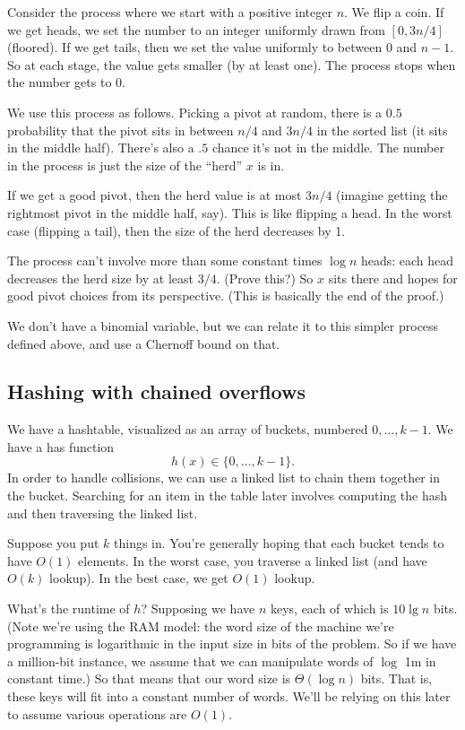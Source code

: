 \documentclass{article}
\begin{document}
Consider the process where we start with a positive integer $n$.
We flip a coin. 
If we get heads, we set the number to an integer uniformly drawn from
$[0, 3n/4]$ (floored).
If we get tails, then we set the value uniformly to between $0$ and $n - 1$.
So at each stage, the value gets smaller (by at least one).
The process stops when the number gets to 0.

We use this process as follows. 
Picking a pivot at random,
there is a $0.5$ probability that the pivot sits in between $n/4$ and $3n/4$ in the sorted list (it sits in the middle half).
There's also a $.5$ chance it's not in the middle.
The number in the process is just the size of the ``herd'' $x$ is in.

If we get a good pivot, then the herd value is at most $3n/4$ (imagine
getting the rightmost pivot in the middle half, say).
This is like flipping a head.
In the worst case (flipping a tail), then the size of the herd decreases by 1.

The process can't involve more than some constant times $\log n$ heads:
each head decreases the herd size by at least $3/4$.
(Prove this?)
So $x$ sits there and hopes for good pivot choices from its perspective.
(This is basically the end of the proof.)

We don't have a binomial variable, but we can relate it to this
simpler process defined above, and use a Chernoff bound on that.


\subsection{Hashing with chained overflows}

We have a hashtable, visualized as an array of buckets, numbered $0,\ldots,k-1$.
We have a has function
$$
h(x) \in \{0,\ldots,k-1\}.
$$
In order to handle collisions, we can use a linked list to chain
them together in the bucket.
Searching for an item in the table later involves computing the hash and
then traversing the linked list.

Suppose you put $k$ things in.
You're generally hoping that each bucket tends to have $O(1)$ elements.
In the worst case, you traverse a linked list (and have $O(k)$ lookup).
In the best case, we get $O(1)$ lookup.

What's the runtime of $h$?
Supposing we have $n$ keys, each of which is $10\lg n$ bits.
(Note we're using the RAM  model: the word size of the machine we're
programming is logarithmic in the input size in bits of the problem.
So if we have a million-bit instance, we assume that we can manipulate
words of $\log$ 1m in constant time.)
So that means that our word size is $\Theta(\log n)$ bits.
That is, these keys will fit into a constant number of words.
We'll be relying on this later to assume various operations are $O(1)$.
\end{document}

